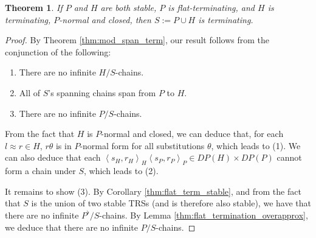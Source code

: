 \documentclass{article}
\newtheorem{theorem}{Theorem}[section]
\newtheorem{definition}[theorem]{Definition}
\newcommand{\dpair}[2]{\left\langle #1, #2 \right\rangle}
\begin{document}
\begin{theorem}
    If $P$ and $H$ are both stable, $P$ is flat-terminating, and $H$ is terminating, $P$-normal and closed, then $S := P \cup H$ is terminating.
\end{theorem}

\begin{proof}
    By Theorem \ref{thm:mod_span_term}, our result follows from the conjunction of the following: \begin{enumerate}
        \item There are no infinite $H/S$-chains.
        \item All of $S$'s spanning chains span from $P$ to $H$.
        \item There are no infinite $P/S$-chains.
    \end{enumerate}
    From the fact that $H$ is $P$-normal and closed, we can deduce that, for each $l \approx r \in H$, $r\theta$ is in $P$-normal form for all substitutions $\theta$, which leads to (1). We can also deduce that each $\dpair{s_H}{r_H}_H \dpair{s_P}{r_P}_P \in DP(H) \times DP(P)$ cannot form a chain under $S$, which leads to (2). 
    
    It remains to show (3). By Corollary \ref{thm:flat_term_stable}, and from the fact that $S$ is the union of two stable TRSs (and is therefore also stable), we have that there are no infinite $P^\flat/S$-chains. By Lemma \ref{thm:flat_termination_overapprox}, we deduce that there are no infinite $P/S$-chains. 
\end{proof}




\end{document}
